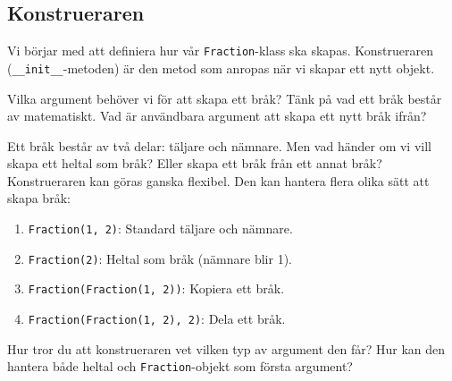 \subsection{Konstrueraren}


Vi börjar med att definiera hur vår \texttt{Fraction}-klass ska
skapas. Konstrueraren (\texttt{__init__}-metoden) är den metod
som anropas när vi skapar ett nytt objekt.

\begin{exercise}
  Vilka argument behöver vi för att skapa ett bråk? Tänk på vad ett bråk
  består av matematiskt.
  Vad är användbara argument att skapa ett nytt bråk ifrån?
\end{exercise}


Ett bråk består av två delar: täljare och nämnare.
Men vad händer om vi vill skapa ett heltal som bråk?
Eller skapa ett bråk från ett annat bråk?
Konstrueraren kan göras ganska flexibel.
Den kan hantera flera olika sätt att skapa bråk:
\begin{enumerate}
  \item \texttt{Fraction(1, 2)}: Standard täljare och nämnare.
  \item \texttt{Fraction(2)}: Heltal som bråk (nämnare blir 1).
  \item \texttt{Fraction(Fraction(1, 2))}: Kopiera ett bråk.
  \item \texttt{Fraction(Fraction(1, 2), 2)}: Dela ett bråk.
\end{enumerate}

\begin{exercise}
  Hur tror du att konstrueraren vet vilken typ av argument den får?
  Hur kan den hantera både heltal och \texttt{Fraction}-objekt som 
  första argument?
\end{exercise}

